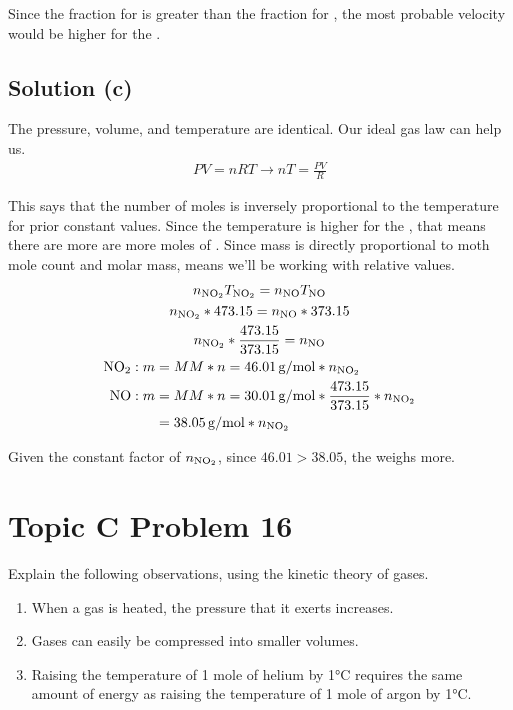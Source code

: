\documentclass[10pt]{article}
\begin{document}
            Since the fraction for  is greater than the fraction for , the most probable velocity would be higher for the . 

        \subsection{Solution (c)}
            The pressure, volume, and temperature are identical. 
            Our ideal gas law can help us. 
            \begin{gather}
                PV  =   nRT \to
                nT  =   \frac{PV}{R}
            \end{gather}

            This says that the number of moles is inversely proportional to the temperature for prior constant values.
            Since the temperature is higher for the , that means there are more are more moles of . 
            Since mass is directly proportional to moth mole count and molar mass, means we'll be working with relative values.
            \begin{gather}
                n_{\ce{NO2}} T_{\ce{NO2}}   =   n_{\ce{NO}} T_{\ce{NO}}\\
                n_{\ce{NO2}} * 473.15   =   n_{\ce{NO}} * 373.15\\
                n_{\ce{NO2}} * \frac{473.15}{373.15}    =   n_{\ce{NO}}\\
                \begin{align}
                    \ce{NO2}:   
                        m   &=  MM * n
                            =   46.01\,\unit{\gram/\mole} * n_{\ce{NO2}}\\
                    \ce{NO}: 
                        m   &=  MM * n
                            =   30.01\,\unit{\gram/\mole} * \frac{473.15}{373.15} * n_{\ce{NO2}}\\
                            &=  38.05\,\unit{\gram/\mole} * n_{\ce{NO2}}
                \end{align}
            \end{gather}

            Given the constant factor of $n_{\ce{NO2}}$, since $46.01 > 38.05$, the  weighs more. 

    \pagebreak
    \section{Topic C Problem 16}
        Explain the following observations, using the kinetic theory of gases.
        \begin{enumerate} [label=\alph*)]
            \item When a gas is heated, the pressure that it exerts increases.
            \item Gases can easily be compressed into smaller volumes.
            \item Raising the temperature of 1 mole of helium by 1\unit{\celsius} requires the same amount of energy as raising the temperature of 1 mole of argon by 1\unit{\celsius}.
        \end{enumerate}
\end{document}
